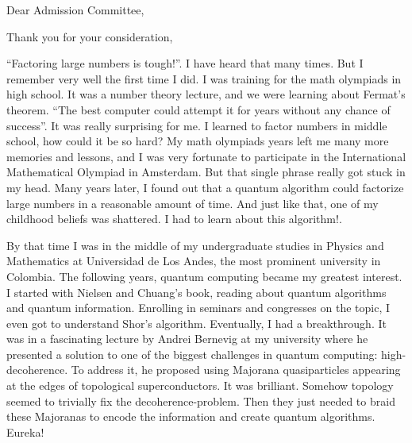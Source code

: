 \documentclass[12pt,a4paper,sans]{moderncv}        %
\begin{document}
\date{December 01, 2018}
\opening{Dear Admission Committee,}
\closing{Thank you for your consideration,}

\makelettertitle

\justify
“Factoring large numbers is tough!”. I have heard that many times. But I remember very well the first time I did. I was training for the math olympiads in high school. It was a number theory lecture, and we were learning about Fermat’s theorem.  “The best computer could attempt it for years without any chance of success”. It was really surprising for me. I learned to factor numbers in middle school, how could it be so hard? My math olympiads years left me many more memories and lessons, and I was very fortunate to participate in the International Mathematical Olympiad in Amsterdam. But that single phrase really got stuck in my head. Many years later, I found out that a quantum algorithm could factorize large numbers in a reasonable amount of time. And just like that, one of my childhood beliefs was shattered. I had to learn about this algorithm!.

By that time I was in the middle of my undergraduate studies in Physics and Mathematics at Universidad de Los Andes, the most prominent university in Colombia. The following years, quantum computing became my greatest interest. I started with Nielsen and Chuang’s book, reading about quantum algorithms and quantum information. Enrolling in seminars and congresses on the topic, I even got to understand Shor’s algorithm. Eventually, I had a breakthrough. It was in a fascinating lecture by Andrei Bernevig at my university where he presented a solution to one of the biggest challenges in quantum computing: high-decoherence. To address it, he proposed using Majorana quasiparticles appearing at the edges of topological superconductors. It was brilliant. Somehow topology seemed to trivially fix the decoherence-problem. Then they just needed to braid these Majoranas to encode the information and create quantum algorithms. Eureka!
\end{document}
